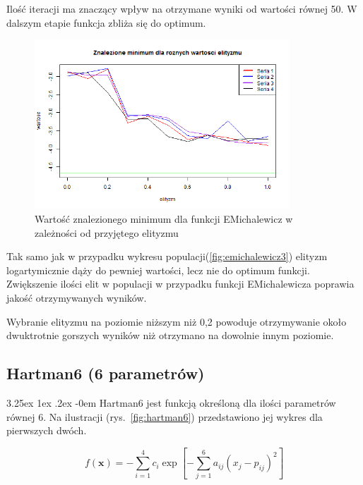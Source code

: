 \documentclass[11pt, a4paper]{article}
\makeatletter
\newcommand{\fbi}{\leavevmode{\parindent=1em\indent}}
\renewcommand\paragraph{\@startsection{paragraph}{5}{\z@}
  {3.25ex \@plus1ex \@minus.2ex}
  {-0em}
  {\normalfont\normalsize\bfseries}}
\makeatother
\begin{document}
\fbi
Ilość iteracji ma znaczący wpływ na otrzymane wyniki od wartości równej 50. W dalszym etapie funkcja zbliża się do optimum.

\begin{figure}[H]
	\begin{center}
		\includegraphics[width=0.85\textwidth]{./assets/EMichalewicz6.png}
		\caption{Wartość znalezionego minimum dla funkcji EMichalewicz w zależności od przyjętego elityzmu}
		\label{fig:emichalewicz6}
	\end{center}
\end{figure}

\fbi
Tak samo jak w przypadku wykresu populacji(\ref{fig:emichalewicz3}) elityzm logartymicznie dąży do pewniej wartości, lecz nie do optimum funkcji. Zwiększenie ilości elit w populacji w przypadku funkcji EMichalewicza poprawia jakość otrzymywanych wyników.

\fbi
Wybranie elityzmu na poziomie niższym niż 0,2 powoduje otrzymywanie około dwuktrotnie gorszych wyników niż otrzymano na dowolnie innym poziomie.

\newpage
\subsection{Hartman6 (6 parametrów)}
\paragraph{}
Hartman6 jest funkcją określoną dla ilości parametrów równej 6. Na ilustracji (rys.~\ref{fig:hartman6}) przedstawiono jej wykres dla pierwszych dwóch.

\begin{equation}\label{eq:hartman6}
f(\boldsymbol{x}) = - \sum_{i=1}^{4} c_i \exp[- \sum_{j=1}^{6} a_{ij}(x_j - p_{ij})^2]
\end{equation}
\end{document}
